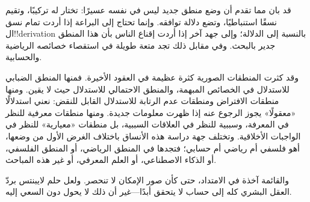 \documentclass[../../../include/open-logic-section]{subfiles}
\begin{document}


قد بان مما تقدم أن وضع منطق جديد ليس في نفسه عسيرًا: تختار
له تركيبًا، وتقيم نسقًا استنباطيًا، وتضع دلالة توافقه. وإنما
تحتاج إلى البراعة إذا أردت تمام نسق ال!!{derivation} بالنسبة
إلى الدلالة؛ وإلى جهد آخر إذا أردت إقناع الناس بأن هذا المنطق
جدير بالبحث. وفي مقابل ذلك تجد متعة طويلة في استقصاء خصائصه
الرياضية والحسابية.

وقد كثرت المنطقات الصورية كثرة عظيمة في العقود الأخيرة.
فمنها المنطق الضبابي للاستدلال في الخصائص المبهمة، والمنطق
الاحتمالي للاستدلال حيث لا يقين. ومنها منطقات الافتراض ومنطقات
عدم الرتابة للاستدلال القابل للنقض: نعني استدلالًا «معقولًا»
يجوز الرجوع عنه إذا ظهرت معلومات جديدة. ومنها منطقات معرفية
للنظر في المعرفة، وسببية للنظر في العلاقات السببية، بل منطقات
«معيارية» للنظر في الواجبات الأخلاقية. وتختلف جهة دراسة هذه
الأنساق باختلاف الغرض الأول من وضعها، أهو فلسفي أم رياضي أم
حسابي؛ فتجدها في المنطق الرياضي، أو المنطق الفلسفي، أو الذكاء
الاصطناعي، أو العلم المعرفي، أو غير هذه المباحث.

والقائمة آخذة في الامتداد، حتى كأن صور الإمكان لا تنحصر. ولعل
حلم لايبنتس بردّ العقل البشري كله إلى حساب لا يتحقق أبدًا---غير
أن ذلك لا يحول دون السعي إليه.
\end{document}
